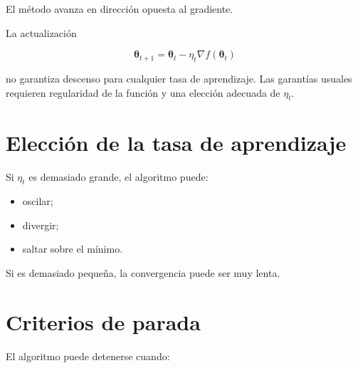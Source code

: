 \documentclass[
  spanish,
  10.5pt,
  letterpaper,
  DIV=11,
  numbers=noendperiod,
  oneside,
  open=any]{scrreprt}
\providecommand{\tightlist}{%
  \setlength{\itemsep}{0pt}\setlength{\parskip}{0pt}}
\theoremstyle{definition}
\theoremstyle{definition}
\theoremstyle{plain}
\theoremstyle{remark}
\begin{document}
El método avanza en dirección opuesta al gradiente.

\begin{tcolorbox}[enhanced jigsaw, arc=.35mm, bottomrule=.15mm, bottomtitle=1mm, breakable, colback=white, colbacktitle=quarto-callout-warning-color!10!white, colframe=quarto-callout-warning-color-frame, coltitle=black, left=2mm, leftrule=.75mm, opacityback=0, opacitybacktitle=0.6, rightrule=.15mm, title=\textcolor{quarto-callout-warning-color}{\faExclamationTriangle}\hspace{0.5em}{Descenso por gradiente}, titlerule=0mm, toprule=.15mm, toptitle=1mm]

La actualización

\[
\boldsymbol{\theta}_{t+1}
=
\boldsymbol{\theta}_t
-
\eta_t\nabla f(\boldsymbol{\theta}_t)
\]

no garantiza descenso para cualquier tasa de aprendizaje. Las garantías
usuales requieren regularidad de la función y una elección adecuada de
\(\eta_t\).

\end{tcolorbox}

\section*{Elección de la tasa de
aprendizaje}\label{elecciuxf3n-de-la-tasa-de-aprendizaje}


Si \(\eta_t\) es demasiado grande, el algoritmo puede:

\begin{itemize}
\tightlist
\item
  oscilar;
\item
  divergir;
\item
  saltar sobre el mínimo.
\end{itemize}

Si es demasiado pequeña, la convergencia puede ser muy lenta.

\section*{Criterios de parada}\label{criterios-de-parada}


El algoritmo puede detenerse cuando:
\end{document}
